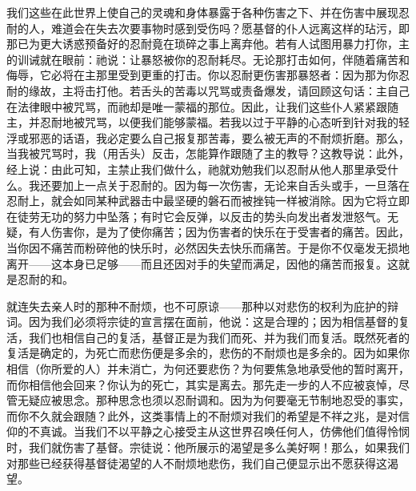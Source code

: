 我们这些在此世界上使自己的灵魂和身体暴露于各种伤害之下、并在伤害中展现忍耐的人，难道会在失去次要事物时感到受伤吗？愿基督的仆人远离这样的玷污，即那已为更大诱惑预备好的忍耐竟在琐碎之事上离弃他。若有人试图用暴力打你，主的训诫就在眼前：祂说：让暴怒被你的忍耐耗尽。无论那打击如何，伴随着痛苦和侮辱，它必将在主那里受到更重的打击。你以忍耐更伤害那暴怒者：因为那为你忍耐的缘故，主将击打他。若舌头的苦毒以咒骂或责备爆发，请回顾这句话：主自己在法律眼中被咒骂，而祂却是唯一蒙福的那位。因此，让我们这些仆人紧紧跟随主，并忍耐地被咒骂，以便我们能够蒙福。若我以过于平静的心态听到针对我的轻浮或邪恶的话语，我必定要么自己报复那苦毒，要么被无声的不耐烦折磨。那么，当我被咒骂时，我（用舌头）反击，怎能算作跟随了主的教导？这教导说：此外，经上说：由此可知，主禁止我们做什么，祂就劝勉我们以忍耐从他人那里承受什么。我还要加上一点关于忍耐的。因为每一次伤害，无论来自舌头或手，一旦落在忍耐上，就会如同某种武器击中最坚硬的磐石而被挫钝一样被消除。因为它将立即在徒劳无功的努力中坠落；有时它会反弹，以反击的势头向发出者发泄怒气。无疑，有人伤害你，是为了使你痛苦；因为伤害者的快乐在于受害者的痛苦。因此，当你因不痛苦而粉碎他的快乐时，必然因失去快乐而痛苦。于是你不仅毫发无损地离开——这本身已足够——而且还因对手的失望而满足，因他的痛苦而报复。这就是忍耐的和。\par


就连失去亲人时的那种不耐烦，也不可原谅——那种以对悲伤的权利为庇护的辩词。因为我们必须将宗徒的宣言摆在面前，他说：这是合理的；因为相信基督的复活，我们也相信自己的复活，基督正是为我们而死、并为我们而复活。既然死者的复活是确定的，为死亡而悲伤便是多余的，悲伤的不耐烦也是多余的。因为如果你相信（你所爱的人）并未消亡，为何还要悲伤？为何要焦急地承受他的暂时离开，而你相信他会回来？你认为的死亡，其实是离去。那先走一步的人不应被哀悼，尽管无疑应被思念。那种思念也须以忍耐调和。因为为何要毫无节制地忍受的事实，而你不久就会跟随？此外，这类事情上的不耐烦对我们的希望是不祥之兆，是对信仰的不真诚。当我们不以平静之心接受主从这世界召唤任何人，仿佛他们值得怜悯时，我们就伤害了基督。宗徒说：他所展示的渴望是多么美好啊！那么，如果我们对那些已经获得基督徒渴望的人不耐烦地悲伤，我们自己便显示出不愿获得这渴望。\par

